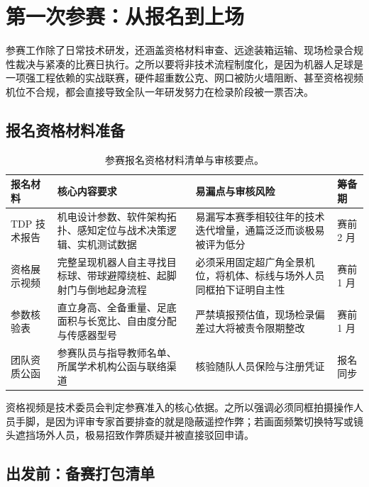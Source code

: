\section{第一次参赛：从报名到上场}

参赛工作除了日常技术研发，还涵盖资格材料审查、远途装箱运输、现场检录合规性裁决与紧凑的比赛日执行。之所以要将非技术流程制度化，是因为机器人足球是一项强工程依赖的实战联赛，硬件超重数公克、网口被防火墙阻断、甚至资格视频机位不合规，都会直接导致全队一年研发努力在检录阶段被一票否决。\official

\subsection{报名资格材料准备}

\begin{table}[H]
\centering
\small
\begin{tabularx}{\textwidth}{p{2.6cm} p{5.2cm} X p{1.6cm}}
\toprule
\textbf{报名材料} & \textbf{核心内容要求} & \textbf{易漏点与审核风险} & \textbf{筹备期} \\
\midrule
TDP 技术报告 & 机电设计参数、软件架构拓扑、感知定位与战术决策逻辑、实机测试数据 & 易漏写本赛季相较往年的技术迭代增量，通篇泛泛而谈极易被评为低分 & 赛前 2 月 \\
\addlinespace
资格展示视频 & 完整呈现机器人自主寻找目标球、带球避障绕桩、起脚射门与倒地起身流程 & 必须采用固定超广角全景机位，将机体、标线与场外人员同框拍下证明自主性 & 赛前 1 月 \\
\addlinespace
参数核验表 & 直立身高、全备重量、足底面积与长宽比、自由度分配与传感器型号 & 严禁填报预估值，现场检录偏差过大将被责令限期整改 & 赛前 1 月 \\
\addlinespace
团队资质公函 & 参赛队员与指导教师名单、所属学术机构公函与联络渠道 & 核验随队人员保险与注册凭证 & 报名同步 \\
\bottomrule
\end{tabularx}
\caption{参赛报名资格材料清单与审核要点。}
\end{table}

资格视频是技术委员会判定参赛准入的核心依据。之所以强调必须同框拍摄操作人员手脚，是因为评审专家首要排查的就是隐蔽遥控作弊；若画面频繁切换特写或镜头遮挡场外人员，极易招致作弊质疑并被直接驳回申请。

\subsection{出发前：备赛打包清单}

